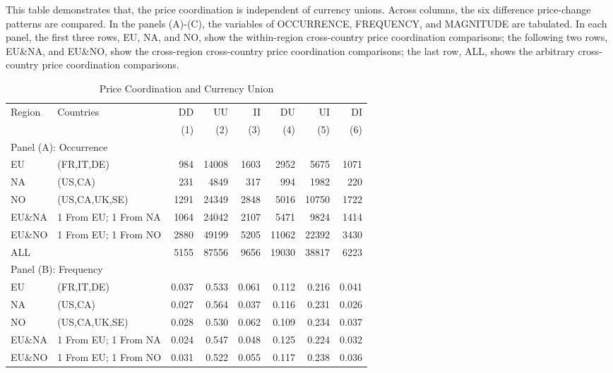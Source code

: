 \clearpage
\begin{table}
	\caption{Price Coordination and Currency Union}\label{tbl:coordination}
	{\footnotesize This table demonstrates that, the price coordination is independent of currency unions. Across columns, the six difference price-change patterns are compared. In the panels (A)-(C), the variables of OCCURRENCE, FREQUENCY, and MAGNITUDE are tabulated. In each panel, the first three rows, EU, NA, and NO, show the within-region cross-country price coordination comparisons; the following two rows, EU\&NA, and EU\&NO, show the cross-region cross-country price coordination comparisons; the last row, ALL, shows the arbitrary cross-country price coordination comparisons.
	\begin{tabular}{llrrrrrr}
		\hline\hline
		Region & Countries            &    DD &    UU &    II &    DU &    UI &    DI \\
		       &                      &   (1) &   (2) &   (3) &   (4) &   (5) &   (6) \\ \hline\hline
		\multicolumn{8}{l}{Panel (A): Occurrence}                                     \\ \hline
		EU     & (FR,IT,DE)           &   984 & 14008 &  1603 &  2952 &  5675 &  1071 \\
		NA     & (US,CA)              &   231 &  4849 &   317 &   994 &  1982 &   220 \\
		NO     & (US,CA,UK,SE)        &  1291 & 24349 &  2848 &  5016 & 10750 &  1722 \\
		EU\&NA & 1 From EU; 1 From NA &  1064 & 24042 &  2107 &  5471 &  9824 &  1414 \\
		EU\&NO & 1 From EU; 1 From NO &  2880 & 49199 &  5205 & 11062 & 22392 &  3430 \\
		ALL    &                      &  5155 & 87556 &  9656 & 19030 & 38817 &  6223 \\ \hline
		\multicolumn{8}{l}{Panel (B): Frequency}                                      \\ \hline
		EU     & (FR,IT,DE)           & 0.037 & 0.533 & 0.061 & 0.112 & 0.216 & 0.041 \\
		NA     & (US,CA)              & 0.027 & 0.564 & 0.037 & 0.116 & 0.231 & 0.026 \\
		NO     & (US,CA,UK,SE)        & 0.028 & 0.530 & 0.062 & 0.109 & 0.234 & 0.037 \\
		EU\&NA & 1 From EU; 1 From NA & 0.024 & 0.547 & 0.048 & 0.125 & 0.224 & 0.032 \\
		EU\&NO & 1 From EU; 1 From NO & 0.031 & 0.522 & 0.055 & 0.117 & 0.238 & 0.036 \\

\end{tabular}}
\end{table}
